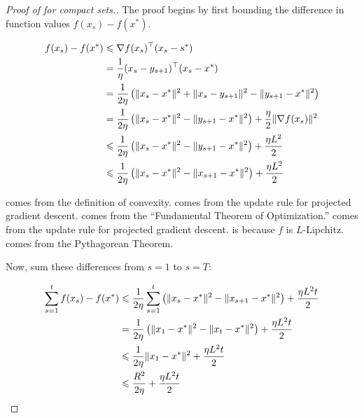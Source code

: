 \begin{proof}[Proof of  for compact sets.]

The proof begins by first bounding the difference in function values $f(x_s) -
f(x^*)$.

\begin{align}
    f(x_s) - f(x^*) &\leq \nabla f(x_s)^\trans (x_s - s^*) \equationlabel{a} \\
    &= \frac{1}{\eta}(x_s - y_{s+1})^\trans(x_s - x^*) \equationlabel{b} \\
    &= \frac{1}{2\eta} \left(\lVert x_s - x^* \rVert^2 + \lVert x_s - y_{s+1} \rVert^2 - \lVert y_{s+1} - x^* \rVert^2 \right) \equationlabel{c} \\
    &= \frac{1}{2\eta} \left(\lVert x_s - x^* \rVert^2 - \lVert y_{s+1} - x^* \rVert^2 \right) + \frac{\eta}{2} \lVert \nabla f(x_s) \rVert^2 \equationlabel{d} \\
    &\leq \frac{1}{2\eta} \left(\lVert x_s - x^* \rVert^2 - \lVert y_{s+1} - x^* \rVert^2 \right) + \frac{\eta L^2}{2} \equationlabel{e} \\
    &\leq \frac{1}{2\eta} \left(\lVert x_s - x^* \rVert^2 - \lVert x_{s+1} - x^* \rVert^2 \right) + \frac{\eta L^2}{2} \equationlabel{f} \\
\end{align}

 comes from the definition of convexity.  comes
from the update rule for projected gradient descent.  comes from
the ``Fundamental Theorem of Optimization.''  comes from the
update rule for projected gradient descent.  is because $f$ is
$L$-Lipchitz. 
comes from the Pythagorean Theorem.

Now, sum these differences from $s=1$ to $s=T$:

\begin{align}
   \sum_{s=1}^t f(x_s) - f(x^*) &\leq  \frac{1}{2\eta} \sum_{s=1}^t \left(\lVert x_s - x^* \rVert^2 - \lVert x_{s+1} - x^* \rVert^2 \right) + \frac{\eta L^2 t}{2} \equationlabel{g} \\
   &= \frac{1}{2\eta} \left(\lVert x_1 - x^* \rVert^2 - \lVert x_{t} - x^{*} \rVert^2 \right) + \frac{\eta L^2 t}{2} \equationlabel{h} \\
   &\leq \frac{1}{2\eta} \lVert x_1 - x^* \rVert^2 + \frac{\eta L^2 t}{2} \equationlabel{i} \\
   &\leq \frac{R^2}{2\eta} + \frac{\eta L^2 t}{2} \equationlabel{j} \\
\end{align}


\end{proof}
